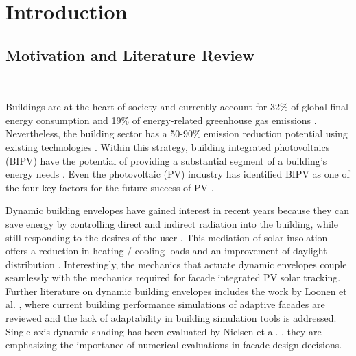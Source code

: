 \chapter{Introduction}


\section{Motivation and Literature Review}\
\label{ch:motivation}

	Buildings are at the heart of society and currently account for 32\% of global final energy consumption and 19\% of energy-related greenhouse gas emissions \cite{IPCC}. Nevertheless, the building sector has a 50-90\% emission reduction potential using existing technologies \cite{IPCC}. Within this strategy, building integrated photovoltaics (BIPV) have the potential of providing a substantial segment of a building's energy needs \cite{defaix2012technical}. Even the photovoltaic (PV) industry has identified BIPV as one of the four key factors for the future success of PV \cite{raugei2009life}. 



	Dynamic building envelopes have gained interest in recent years because they can save energy by controlling direct and indirect radiation into the building, while still responding to the desires of the user \cite{loonen2013climate}. This mediation of solar insolation offers a reduction in heating / cooling loads and an improvement of daylight distribution \cite{rossi2012adaptive}. Interestingly, the mechanics that actuate dynamic envelopes couple seamlessly with the mechanics required for facade integrated PV solar tracking. Further literature on dynamic building envelopes includes the work by Loonen et al. \cite{loonen16}, where current building performance simulations of adaptive facades are reviewed and the lack of adaptability in building simulation tools is addressed. Single axis dynamic shading has been evaluated by Nielsen et al. \cite{nielsen2011quantifying}, they are emphasizing the importance of numerical evaluations in facade design decisions. 

